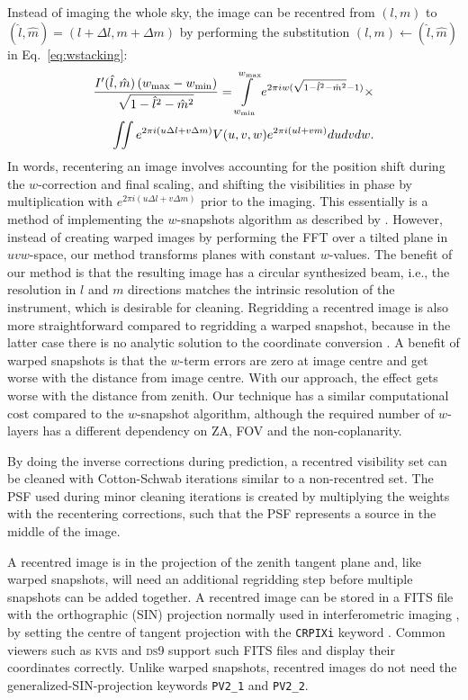 \documentclass[useAMS,usenatbib]{mn2e}
\begin{document}
Instead of imaging the whole sky, the image can be recentred from $(l,m)$ to $(\hat{l},\hat{m})=(l+\Delta l,m+\Delta m)$ by performing the substitution $(l,m)\leftarrow(\hat{l},\hat{m})$ in Eq.~\eqref{eq:wstacking}:
\begin{align}\notag
\frac{I'(\hat{l}, \hat{m})\left(w_{\max} - w_{\min}\right)}{\sqrt{1-\hat{l}^2-\hat{m}^2}} = \int\limits_{w_{\min}}^{w_{\max}} e^{2\pi i w(\sqrt{1-\hat{l}^2-\hat{m}^2}-1)} \times \\
\iint e^{2 \pi i \left(u\Delta l + v\Delta m\right)} V(u,v,w) e^{2\pi i \left(ul + vm\right)} du dv dw.
\end{align}
In words, recentering an image involves accounting for the position shift during the $w$-correction and final scaling, and shifting the visibilities in phase by multiplication with $e^{2 \pi i \left(u\Delta l + v\Delta m\right)}$ prior to the imaging. This essentially is a method of implementing the $w$-snapshots algorithm as described by \citet{widefield-imaging-ska-cornwell}. However, instead of creating warped images by performing the FFT over a tilted plane in $uvw$-space, our method transforms planes with constant $w$-values. The benefit of our method is that the resulting image has a circular synthesized beam, i.e., the resolution in $l$ and $m$ directions matches the intrinsic resolution of the instrument, which is desirable for cleaning. Regridding a recentred image is also more straightforward compared to regridding a warped snapshot, because in the latter case there is no analytic solution to the coordinate conversion \citep{perley-noncoplanar-arrays}. A benefit of warped snapshots is that the $w$-term errors are zero at image centre and get worse with the distance from image centre. With our approach, the effect gets worse with the distance from zenith. Our technique has a similar computational cost compared to the $w$-snapshot algorithm, although the required number of $w$-layers has a different dependency on ZA, FOV and the non-coplanarity.

By doing the inverse corrections during prediction, a recentred visibility set can be cleaned with Cotton-Schwab iterations similar to a non-recentred set. The PSF used during minor cleaning iterations is created by multiplying the weights with the recentering corrections, such that the PSF represents a source in the middle of the image.

A recentred image is in the projection of the zenith tangent plane and, like warped snapshots, will need an additional regridding step before multiple snapshots can be added together. A recentred image can be stored in a FITS file with the orthographic (SIN) projection normally used in interferometric imaging \citep{fits-coordinates-2002}, by setting the centre of tangent projection with the \texttt{CRPIXi} keyword \citep{wcs-in-fits}. Common viewers such as \textsc{kvis} \citep{karma-1996} and \textsc{ds9} support such FITS files and display their coordinates correctly. Unlike warped snapshots, recentred images do not need the generalized-SIN-projection keywords \texttt{PV2\_1} and \texttt{PV2\_2}.
\end{document}
